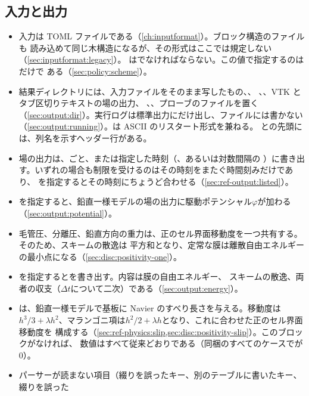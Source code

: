 \subsection*{入力と出力}

\begin{itemize}
  \item 入力は TOML ファイルである（\cref{ch:inputformat}）。ブロック構造のファイルも
    読み込めて同じ木構造になるが、その形式はここでは規定しない（\cref{sec:inputformat:legacy}）。
    はでなければならない。この値で指定するのはだけで
    ある（\cref{sec:policy:scheme}）。
  \item 結果ディレクトリには、入力ファイルをそのまま写したもの、、
    、、VTK とタブ区切りテキストの場の出力、
    、、プローブのファイルを置く
    （\cref{sec:output:dir}）。実行ログは標準出力にだけ出し、ファイルには書かない
    （\cref{sec:output:running}）。は ASCII のリスタート形式を兼ねる。
    との先頭には、列名を示すヘッダー行がある。
  \item 場の出力は、ごと、または指定した時刻（、あるいは対数間隔の
    ）に書き出す。いずれの場合も制限を受けるのはその時刻をまたぐ時間刻みだけであり、
    を指定するとその時刻にちょうど合わせる（\cref{sec:ref-output:listed}）。
  \item {}を指定すると、鉛直一様モデルの場の出力に駆動ポテンシャル$\varphi$が加わる
    （\cref{sec:output:potential}）。
  \item 毛管圧、分離圧、鉛直方向の重力は、正のセル界面移動度を一つ共有する。そのため、スキームの散逸は
    平方和となり、定常な膜は離散自由エネルギーの最小点になる（\cref{sec:disc:positivity-one}）。
  \item {}を指定するとを書き出す。内容は膜の自由エネルギー、
    スキームの散逸、両者の収支（$\Delta t$について二次）である（\cref{sec:output:energy}）。
  \item {}は、鉛直一様モデルで基板に Navier のすべり長さを与える。移動度は
    $h^3/3 + \lambda h^2$、マランゴニ項は$h^2/2 + \lambda h$となり、これに合わせた正のセル界面移動度を
    構成する（\cref{sec:ref-physics:slip,sec:disc:positivity-slip}）。このブロックがなければ、
    数値はすべて従来どおりである（同梱のすべてのケースでが 0）。
  \item パーサーが読まない項目（綴りを誤ったキー、別のテーブルに書いたキー、綴りを誤った

\end{itemize}
